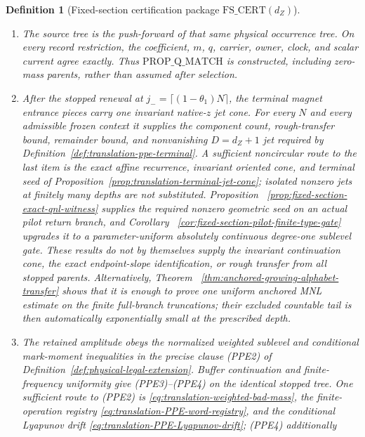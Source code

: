 \documentclass[11pt]{article}
\newtheorem{definition}[theorem]{Definition}
\begin{document}
\begin{definition}[Fixed-section certification package
$\mathrm{FS\_CERT}(d_Z)$]
\begin{enumerate}[label=\textup{(FS\arabic*)}]
\begin{enumerate}[label=\textup{(FS3\alph*)}]
moment is exactly the measured-family boundary estimate in
Lemma~\ref{lem:fractional-family-boundary-mark}.  This route never divides by the
mass of a rare owner and therefore asks for no hereditary conditional
moment.
\end{enumerate}
\item The source tree is the push-forward of that same physical occurrence
tree.  On every record restriction, the coefficient, $m$, $q$, carrier,
owner, clock, and scalar current agree exactly.  Thus
$\mathrm{PROP\_Q\_MATCH}$ is constructed, including zero-mass parents,
rather than assumed after selection.
\item After the stopped renewal at
$j_- =\lceil(1-\theta_1)N\rceil$, the terminal magnet entrance pieces carry
one invariant native-$z$ jet cone.  For every $N$ and every admissible frozen
context it supplies the component count, rough-transfer bound, remainder
bound, and nonvanishing $D=d_Z+1$ jet required by
Definition~\ref{def:translation-ppe-terminal}.  A sufficient noncircular
route to the last item is the exact affine recurrence, invariant oriented
cone, and terminal seed of
Proposition~\ref{prop:translation-terminal-jet-cone}; isolated nonzero jets
at finitely many depths are not substituted.  Proposition~
\ref{prop:fixed-section-exact-qnl-witness} supplies the required nonzero
geometric seed on an actual pilot return branch, and Corollary~
\ref{cor:fixed-section-pilot-finite-type-gate} upgrades it to a
parameter-uniform absolutely continuous degree-one sublevel gate.  These
results do not by themselves supply the invariant continuation cone, the
exact endpoint-slope identification, or rough transfer from all stopped
parents.  Alternatively, Theorem~
\ref{thm:anchored-growing-alphabet-transfer} shows that it is enough to prove
one uniform anchored MNL estimate on the finite full-branch truncations;
their excluded countable tail is then automatically exponentially small at
the prescribed depth.
\item The retained amplitude obeys the normalized weighted sublevel and
conditional mark-moment inequalities in the precise clause \textup{(PPE2)}
of Definition~\ref{def:physical-legal-extension}.  Buffer
continuation and finite-frequency uniformity give \textup{(PPE3)--(PPE4)}
on the identical stopped tree.  One sufficient route to \textup{(PPE2)} is
\eqref{eq:translation-weighted-bad-mass}, the finite-operation registry
\eqref{eq:translation-PPE-word-registry}, and the conditional Lyapunov drift
\eqref{eq:translation-PPE-Lyapunov-drift}; \textup{(PPE4)} additionally

\end{enumerate}
\end{definition}
\end{document}
